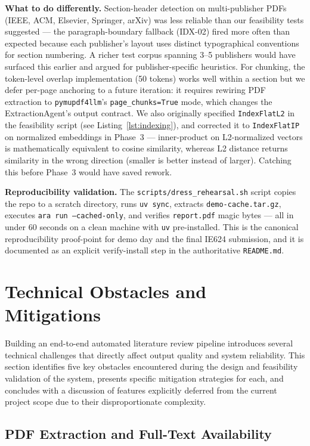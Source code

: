 \documentclass[12pt,a4paper]{article}
\begin{document}
\textbf{What to do differently.} Section-header detection on multi-publisher PDFs
(IEEE, ACM, Elsevier, Springer, arXiv) was less reliable than our feasibility tests
suggested --- the paragraph-boundary fallback (IDX-02) fired more often than
expected because each publisher's layout uses distinct typographical conventions
for section numbering. A richer test corpus spanning 3--5 publishers would have
surfaced this earlier and argued for publisher-specific heuristics. For chunking,
the token-level overlap implementation (50 tokens) works well within a section
but we defer per-page anchoring to a future iteration: it requires rewiring PDF
extraction to \texttt{pymupdf4llm}'s \texttt{page\_chunks=True} mode, which changes
the ExtractionAgent's output contract. We also originally specified
\texttt{IndexFlatL2} in the feasibility script (see Listing~\ref{lst:indexing}),
and corrected it to \texttt{IndexFlatIP} on normalized embeddings in Phase~3 ---
inner-product on L2-normalized vectors is mathematically equivalent to cosine
similarity, whereas L2 distance returns similarity in the wrong direction
(smaller is better instead of larger). Catching this before Phase~3 would have
saved rework.

\textbf{Reproducibility validation.} The \texttt{scripts/dress\_rehearsal.sh}
script copies the repo to a scratch directory, runs \texttt{uv sync}, extracts
\texttt{demo-cache.tar.gz}, executes \texttt{ara run --cached-only}, and verifies
\texttt{report.pdf} magic bytes --- all in under 60 seconds on a clean machine with
\texttt{uv} pre-installed. This is the canonical reproducibility proof-point for
demo day and the final IE624 submission, and it is documented as an explicit
verify-install step in the authoritative \texttt{README.md}.

\section{Technical Obstacles and Mitigations}
Building an end-to-end automated literature review pipeline introduces several technical challenges that directly affect output quality and system reliability. This section identifies five key obstacles encountered during the design and feasibility validation of the system, presents specific mitigation strategies for each, and concludes with a discussion of features explicitly deferred from the current project scope due to their disproportionate complexity.

\subsection{PDF Extraction and Full-Text Availability}
\end{document}
